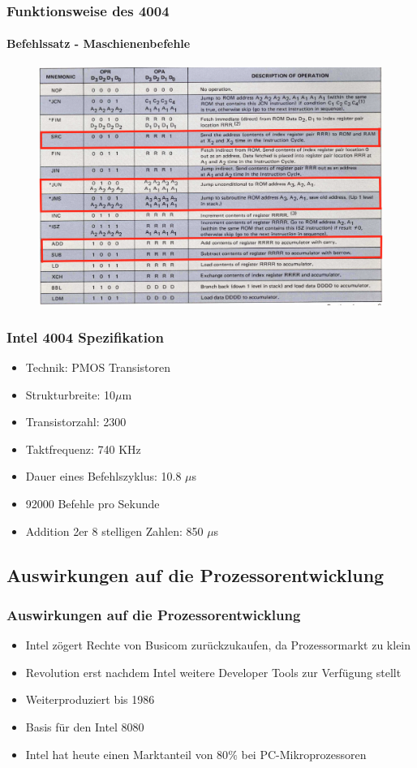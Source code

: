 \begin{frame}
	\frametitle{Funktionsweise des 4004}
	\framesubtitle{Befehlssatz - Maschienenbefehle}
	\begin{figure}[ht]
		\includegraphics[width=0.8\linewidth]{images/instruction_machine.png}
	\end{figure}
\end{frame}

\begin{frame}
	\frametitle{Intel 4004 Spezifikation}
	\begin{itemize}
		\item Technik: PMOS Transistoren
		\item Strukturbreite: 10$\mu$m
		\item Transistorzahl: 2300
		\item Taktfrequenz: 740 KHz
		\item Dauer eines Befehlszyklus: 10.8 $\mu$s
		\item 92000 Befehle pro Sekunde
		\item Addition 2er 8 stelligen Zahlen: 850 $\mu$s
	\end{itemize}
\end{frame}

\subsection{Auswirkungen auf die Prozessorentwicklung}
\begin{frame}
	\frametitle{Auswirkungen auf die Prozessorentwicklung}
	\begin{itemize}
		\item Intel zögert Rechte von Busicom zurückzukaufen, da Prozessormarkt zu klein
		\item {\grqq}Revolution{\grqq} erst nachdem Intel weitere Developer Tools zur Verfügung stellt
		\item Weiterproduziert bis 1986
		\item Basis für den Intel 8080
		\item Intel hat heute einen Marktanteil von 80$\%$ bei PC-Mikroprozessoren
	\end{itemize}
\end{frame}

